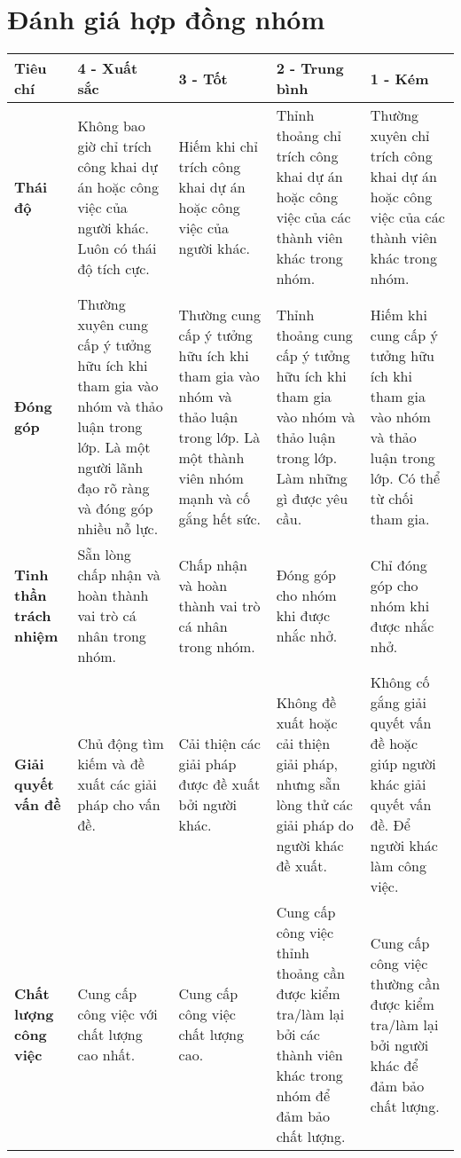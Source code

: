 \documentclass[a4paper, 12pt]{article}
\begin{document}
\section{Đánh giá hợp đồng nhóm}
\begin{tabular}{|p{2cm}|p{3cm}|p{3cm}|p{3cm}|p{3cm}|}
    \hline
    \textbf{Tiêu chí} & \textbf{4 - Xuất sắc} & \textbf{3 - Tốt} & \textbf{2 - Trung bình} & \textbf{1 - Kém} \\
    \hline
    \textbf{Thái độ} & Không bao giờ chỉ trích công khai dự án hoặc công việc của người khác. Luôn có thái độ tích cực. & Hiếm khi chỉ trích công khai dự án hoặc công việc của người khác. & Thỉnh thoảng chỉ trích công khai dự án hoặc công việc của các thành viên khác trong nhóm. & Thường xuyên chỉ trích công khai dự án hoặc công việc của các thành viên khác trong nhóm. \\
    \hline
    \textbf{Đóng góp} & Thường xuyên cung cấp ý tưởng hữu ích khi tham gia vào nhóm và thảo luận trong lớp. Là một người lãnh đạo rõ ràng và đóng góp nhiều nỗ lực. & Thường cung cấp ý tưởng hữu ích khi tham gia vào nhóm và thảo luận trong lớp. Là một thành viên nhóm mạnh và cố gắng hết sức. & Thỉnh thoảng cung cấp ý tưởng hữu ích khi tham gia vào nhóm và thảo luận trong lớp. Làm những gì được yêu cầu. & Hiếm khi cung cấp ý tưởng hữu ích khi tham gia vào nhóm và thảo luận trong lớp. Có thể từ chối tham gia. \\
    \hline
    \textbf{Tinh thần trách nhiệm} & Sẵn lòng chấp nhận và hoàn thành vai trò cá nhân trong nhóm. & Chấp nhận và hoàn thành vai trò cá nhân trong nhóm. & Đóng góp cho nhóm khi được nhắc nhở. & Chỉ đóng góp cho nhóm khi được nhắc nhở. \\
    \hline
    \textbf{Giải quyết vấn đề} & Chủ động tìm kiếm và đề xuất các giải pháp cho vấn đề. & Cải thiện các giải pháp được đề xuất bởi người khác. & Không đề xuất hoặc cải thiện giải pháp, nhưng sẵn lòng thử các giải pháp do người khác đề xuất. & Không cố gắng giải quyết vấn đề hoặc giúp người khác giải quyết vấn đề. Để người khác làm công việc. \\
    \hline
    \textbf{Chất lượng công việc} & Cung cấp công việc với chất lượng cao nhất. & Cung cấp công việc chất lượng cao. & Cung cấp công việc thỉnh thoảng cần được kiểm tra/làm lại bởi các thành viên khác trong nhóm để đảm bảo chất lượng. & Cung cấp công việc thường cần được kiểm tra/làm lại bởi người khác để đảm bảo chất lượng. \\
    \hline
\end{tabular}
\end{document}
